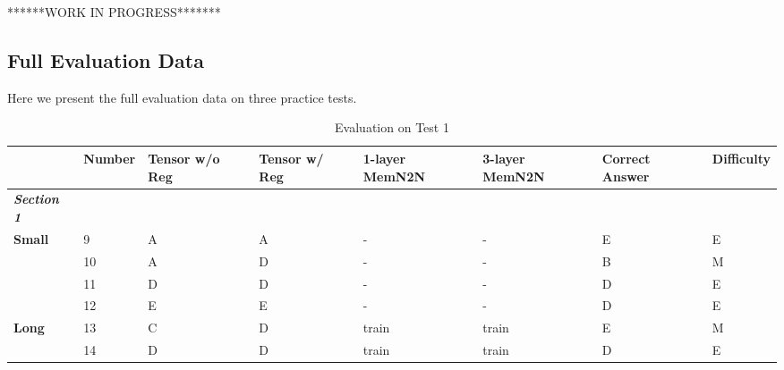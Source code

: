 \documentclass[pageno]{final_paper}
\newcommand{\textbi}[1]{\textbf{\textit{#1}}}
\begin{document}
******WORK IN PROGRESS*******

\subsection{Full Evaluation Data}
\label{Full Evaluation Data}
Here we present the full evaluation data on three practice tests.

\begin{table}[]
\scriptsize
\centering
\caption{Evaluation on Test 1}
\label{tab: Evaluation on Test 1}
\begin{tabular}{llllllll}
\toprule
                         & \textbf{Number} & \textbf{Tensor w/o Reg} & \textbf{Tensor w/ Reg} & \textbf{1-layer MemN2N} & \textbf{3-layer MemN2N} & \textbf{Correct Answer} & \textbf{Difficulty} \\ \midrule
\textbi{Section 1}       &                 &                         &                        &                         &                         &                         &                     \\ \midrule
\textbf{Small}           & 9               & A                       & A                      & -                       & -                       & E                       & E                   \\
\textbf{}                & 10              & A                       & D                      & -                       & -                       & B                       & M                   \\
\textbf{}                & 11              & D                       & D                      & -                       & -                       & D                       & E                   \\
\textbf{}                & 12              & E                       & E                      & -                       & -                       & D                       & E                   \\
\textbf{Long}            & 13              & C                       & D                      & train                   & train                   & E                       & M                   \\
\textbf{}                & 14              & D                       & D                      & train                   & train                   & D                       & E                   \\

\end{tabular}
\end{table}
\end{document}
